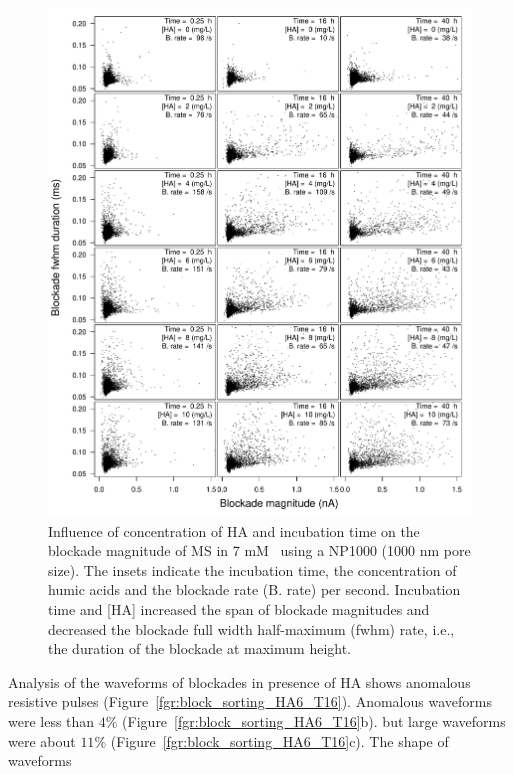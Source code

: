 \documentclass[journal=langd5,manuscript=article]{achemso}
\begin{document}
 \begin{figure}
  \includegraphics[width=\linewidth]{Figures/Scattering_MS_HA_D2_detail.pdf}
  \caption{Influence of concentration of HA and incubation time on the blockade magnitude of MS in 7 mM~ using a NP1000 (1000 nm pore size). The insets indicate the incubation time, the concentration of humic acids and the blockade rate (B. rate) per second. Incubation time and [HA] increased the span of blockade magnitudes and decreased the blockade full  width half-maximum (fwhm) rate, i.e., the duration of the blockade at maximum height.}
\label{fgr:blockades}
\end{figure}



Analysis of the waveforms of blockades in presence of HA shows anomalous resistive pulses
(Figure~\ref{fgr:block_sorting_HA6_T16}).
Anomalous  waveforms were less than  $4\%$
(Figure~\ref{fgr:block_sorting_HA6_T16}b).
but large waveforms were about $11\%$   
(Figure~\ref{fgr:block_sorting_HA6_T16}c). The shape of waveforms 
\end{document}
